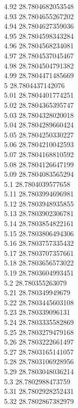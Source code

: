 {4.92	28.7804682053548\\
4.93	28.7804655267202\\
4.94	28.7804627359036\\
4.95	28.7804598343284\\
4.96	28.7804568234081\\
4.97	28.7804537045467\\
4.98	28.7804504791382\\
4.99	28.7804471485669\\
5	28.7804437142076\\
5.01	28.7804401774251\\
5.02	28.7804365395747\\
5.03	28.7804328020018\\
5.04	28.7804289660424\\
5.05	28.7804250330227\\
5.06	28.7804210042593\\
5.07	28.7804168810592\\
5.08	28.7804126647199\\
5.09	28.7804083565294\\
5.1	28.7804039577658\\
5.11	28.7803994696981\\
5.12	28.7803948935855\\
5.13	28.7803902306781\\
5.14	28.7803854822161\\
5.15	28.7803806494306\\
5.16	28.7803757335432\\
5.17	28.7803707357661\\
5.18	28.7803656573022\\
5.19	28.7803604993451\\
5.2	28.780355263079\\
5.21	28.780349949679\\
5.22	28.7803445603108\\
5.23	28.780339096131\\
5.24	28.7803335582869\\
5.25	28.7803279479168\\
5.26	28.7803222661497\\
5.27	28.7803165141057\\
5.28	28.7803106928956\\
5.29	28.7803048036214\\
5.3	28.7802988473759\\
5.31	28.7802928252431\\
5.32	28.7802867382979\\
}
